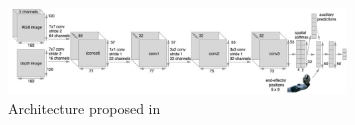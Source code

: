 \begin{figure}[bt]
    \centering
    \includegraphics[width=0.8\textwidth]{Figures/images/deep_imitation_bc/deep_imitation_bc.jpg}
    \caption{Architecture proposed in \cite{zhang2018deep_vr_teleoperation}}
    \label{fig:deep_bc}
\end{figure}
